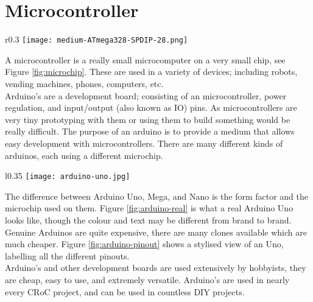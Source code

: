 \documentclass[../TinyBot.tex]{subfiles}
\begin{document}
\section{Microcontroller} \label{sec:microcontroller}
\begin{wrapfigure}[4]{r}{0.3\textwidth}
    \vspace{-1cm}
    \texttt{[image: medium-ATmega328-SPDIP-28.png]}
    \label{fig:microchip}
\end{wrapfigure}

A microcontroller is a really small microcomputer on a very small chip, see Figure \ref{fig:microchip}.
These are used in a variety of devices; including robots, vending machines, phones, computers, etc. \\

Arduino's are a development board; consisting of an microcontroller, power regulation, and input/output (also known as IO) pins. As microcontrollers are very tiny prototyping with them or using them to build something would be really difficult. The purpose of an arduino is to provide a medium that allows easy development with microcontrollers. There are many different kinds of arduinos, each using a different microchip. \\

\begin{wrapfigure}[10]{l}{0.35\textwidth}
    \centering
    \vspace{-0.5cm}
    \texttt{[image: arduino-uno.jpg]}
    \caption{An Arduino Uno}
    \label{fig:arduino-real}
\end{wrapfigure}


The difference between Arduino Uno, Mega, and Nano is the form factor and the microchip used on them. 
Figure \ref{fig:arduino-real} is what a real Arduino Uno looks like, though the colour and text may be different from brand to brand. Genuine Arduinos are quite expensive, there are many clones available which are much cheaper. Figure \ref{fig:arduino-pinout} shows a stylised view of an Uno, labelling all the different pinouts. \\

Arduino's and other development boards are used extensively by hobbyists, they are cheap, easy to use, and extremely versatile. Arduino's are used in nearly every CRoC project, and can be used in countless DIY projects. \\
\end{document}
